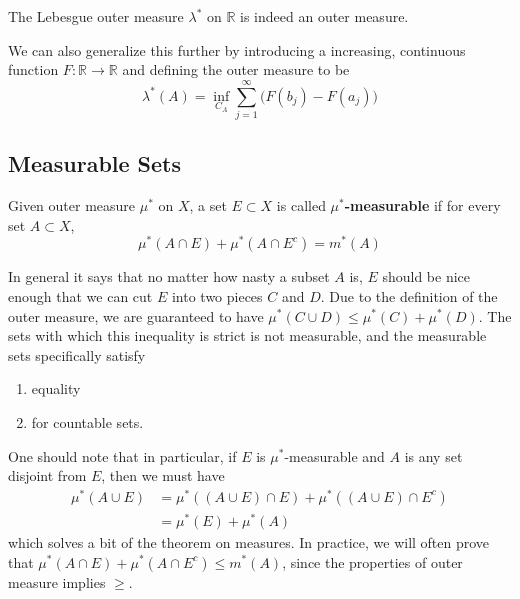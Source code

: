   \begin{lemma}
    The Lebesgue outer measure $\lambda^\ast$ on $\mathbb{R}$ is indeed an outer measure. 
  \end{lemma} 

  We can also generalize this further by introducing a increasing, continuous function $F: \mathbb{R} \rightarrow \mathbb{R}$ and defining the outer measure to be 
  \begin{equation}
   \lambda^\ast (A) = \inf_{C_A} \sum_{j=1}^\infty \big( F(b_j) - F(a_j) \big) 
  \end{equation}

\subsection{Measurable Sets} 

  \begin{definition}
    Given outer measure $\mu^\ast$ on $X$, a set $E \subset X$  is called \textbf{$\mu^\ast$-measurable} if for every set $A \subset X$, 
    \begin{equation}
      \mu^\ast (A \cap E) + \mu^\ast (A \cap E^c) = m^\ast (A) 
    \end{equation}
  \end{definition} 

  In general it says that no matter how nasty a subset $A$ is, $E$ should be nice enough that we can cut $E$ into two pieces $C$ and $D$. Due to the definition of the outer measure, we are guaranteed to have  $\mu^\ast (C \cup D) \leq \mu^\ast (C) + \mu^\ast (D)$. The sets with which this inequality is strict is not measurable, and the measurable sets specifically satisfy 
  \begin{enumerate}
    \item equality 
    \item for countable sets. 
  \end{enumerate}

  One should note that in particular, if $E$ is $\mu^\ast$-measurable and $A$ is any set disjoint from $E$, then we must have 
  \begin{align}
    \mu^\ast (A \cup E) & = \mu^\ast ((A \cup E) \cap E) + \mu^\ast ((A \cup E) \cap E^c) \\ 
                        & = \mu^\ast (E) + \mu^\ast (A)
  \end{align}
  which solves a bit of the theorem on measures. In practice, we will often prove that $\mu^\ast (A \cap E) + \mu^\ast (A \cap E^c) \leq m^\ast (A)$, since the properties of outer measure implies $\geq$. 

